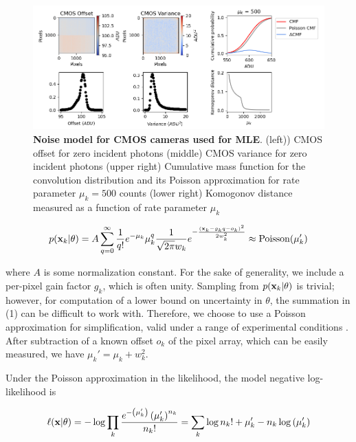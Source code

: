 \begin{figure}[t]
\begin{center}
\includegraphics[width=16cm]{media/Noise.png}
\end{center}
\caption{\textbf{Noise model for CMOS cameras used for MLE}. (left)) CMOS offset for zero incident photons (middle) CMOS variance for zero incident photons (upper right) Cumulative mass function for the convolution distribution and its Poisson approximation for rate parameter $\mu_{k} = 500$ counts (lower right) Komogonov distance measured as a function of rate parameter $\mu_{k}$}
\end{figure}


\begin{equation}
p(\bold{x}_{k}\lvert\theta) = A\sum_{q=0}^{\infty} \frac{1}{q!}e^{-\mu_{k}}\mu_{k}^{q}\frac{1}{\sqrt{2\pi}w_{k}}e^{-\frac{(\bold{x}_{k}-g_{k}q-o_{k})^2}{2 w_{k}^{2}}} \approx \mathrm{Poisson}(\mu_{k}')
\end{equation}

where $A$ is some normalization constant. For the sake of generality, we include a per-pixel gain factor $g_{k}$, which is often unity. Sampling from $p(\bold{x}_{k}\lvert\theta)$ is trivial; however, for computation of a lower bound on uncertainty in $\theta$, the summation in (1) can be difficult to work with. Therefore, we choose to use a Poisson approximation for simplification, valid under a range of experimental conditions \parencite{Huang2013}. After subtraction of a known offset $o_{k}$ of the pixel array, which can be easily measured, we have $\mu_{k}' = \mu_{k} + w_{k}^{2}$.

Under the Poisson approximation in the likelihood, the model negative log-likelihood is

\begin{equation}
\ell(\bold{x}\lvert\theta) = -\log \prod_{k} \frac{e^{-\left(\mu_{k}'\right)}\left(\mu_{k}'\right)^{n_{k}}}{n_{k}!} = \sum_{k}  \log n_{k}! + \mu_{k}' - n_{k}\log\left(\mu_{k}'\right)
\end{equation}

